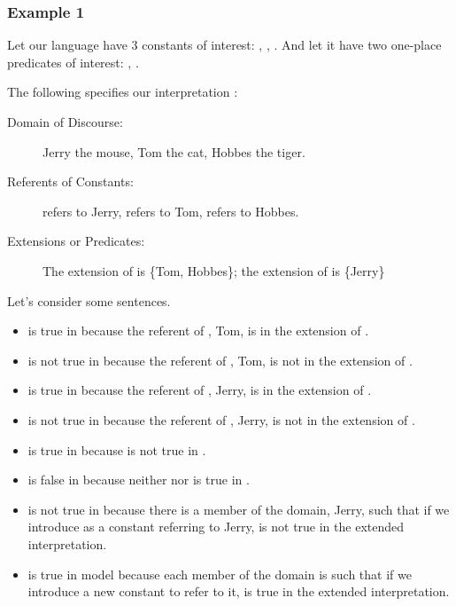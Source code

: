 \subsubsection*{Example 1}

Let our language have 3 constants of interest: , , . And let it 
have two one-place predicates of interest: , .

The following specifies our interpretation \model:

\begin{description}

 \item[Domain of Discourse:] Jerry the mouse, Tom the cat, Hobbes the tiger.

 \item[Referents of Constants:]  refers to Jerry,  refers to Tom,  
  refers to Hobbes.

 \item[Extensions or Predicates:] The extension of  is \{Tom, Hobbes\}; the 
  extension of  is \{Jerry\}

\end{description}

Let's consider some sentences.

\begin{itemize}

 \item {} is true in \model{} because the referent of , Tom, is in the 
  extension of .

 \item {} is not true in \model{} because the referent of , Tom, is not 
  in the extension of .

 \item {} is true in \model{}  because the referent of , Jerry, is in 
  the extension of .

 \item {} is not true in \model{}  because the referent of , Jerry, is 
  not in the extension of .

 \item {} is true in \model{} because   is not true in \model.  

 \item {} is false in \model{}  because neither  
  nor  is true in \model.

 \item {} is not true in \model{} because there is a member of 
  the domain, Jerry, such that if we introduce  as a constant 
  referring to Jerry,  is not true in the extended interpretation.

 \item {} is true in model{}  because each member 
   of the domain is such that if we introduce a new constant 
   to refer to it,   is true in the 
  extended interpretation. 

\end{itemize}


